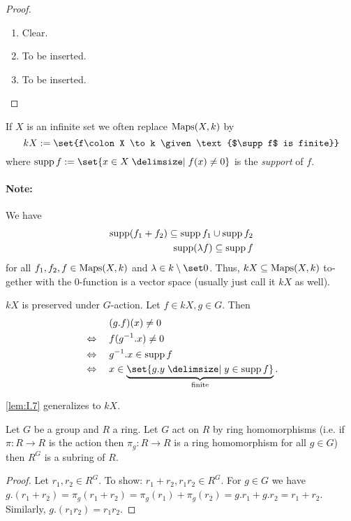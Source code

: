 \documentclass[12pt,a4paper]{scrartcl}
\begin{document}
\begin{otherlanguage}{english}
\begin{lem}
\begin{enumerate}
  \end{enumerate}
\end{lem}
\begin{proof}
  \leavevmode
  \begin{enumerate}[label=\ref{lem:I.7:\arabic*}]
    \item Clear.
    \item To be inserted. %
    \item To be inserted.
    \qedhere
  \end{enumerate}
\end{proof}

If $X$ is an infinite set we often replace $\operatorname{Maps}(X,k)$ by \[kX := \set{f\colon X \to k \given \text{$\supp f$ is finite}} \] where $\supp f := \set{ x \in X \given f(x) \neq 0}$ is the \emph{support} of $f$.

\paragraph{Note:}
We have
\begin{align*}
  \operatorname{supp}(f_1+f_2) \subseteq \operatorname{supp} f_1 \cup \operatorname{supp} f_2 \\
  \operatorname{supp}(\lambda f) \subseteq \operatorname{supp} f
\end{align*}
for all $f_1,f_2,f\in \operatorname{Maps}(X,k)$ and $\lambda \in k\setminus \set0$. Thus, $kX \subseteq \operatorname{Maps}(X,k)$ together with the $0$-function is a vector space (usually just call it $kX$ as well).

$kX$ is preserved under $G$-action. Let $f \in kX, g \in G$. Then 
\begin{align*}
  &\phantom{{}\Leftrightarrow{}}\quad (g.f)(x) \neq 0 \\
  &\Leftrightarrow\quad f(g^{-1} .x ) \neq 0 \\
  &\Leftrightarrow\quad g^{-1}.x \in \supp f\\
  &\Leftrightarrow\quad x \in \underbrace{\set{g.y \given y \in \supp f}}_{\text{finite}}.
\end{align*}

\cref{lem:I.7} generalizes to $kX$.

\begin{lem}
  Let $G$ be a group and $R$ a ring. Let $G$ act on $R$ by ring homomorphisms (i.e. if $\pi\colon R \to R$ is the action then $\pi_g\colon R\to R$ is a ring homomorphism for all $g\in G$) then $R^G$ is a subring of $R$.
\end{lem}
\begin{proof}
  Let $r_1,r_2 \in R^G$. To show: $r_1+r_2,r_1r_2 \in R^G$. For $g \in G$ we have $g.(r_1+r_2) = \pi_g(r_1+r_2) = \pi_g(r_1) + \pi_g(r_2) = g.r_1 + g.r_2 = r_1+r_2$. Similarly, $g.(r_1r_2) = r_1r_2$.
\end{proof}


\end{otherlanguage}
\end{document}
